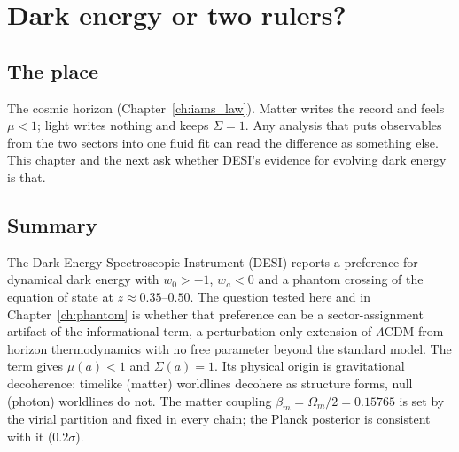 \chapter{Dark energy or two rulers?}\label{ch:sectortension}

\section*{The place}
The cosmic horizon (Chapter~\ref{ch:iams_law}). Matter writes the record and feels $\mu<1$; light writes nothing and keeps $\Sigma=1$. Any analysis that
puts observables from the two sectors into one fluid fit can read the difference as something else. This chapter and the next ask whether DESI's
evidence for evolving dark energy is that.

\section*{Summary}
The Dark Energy Spectroscopic Instrument (DESI) reports a preference for dynamical dark energy with $w_0>-1$, $w_a<0$ and a phantom crossing of the
equation of state at $z\approx0.35$--$0.50$. The question tested here and in Chapter~\ref{ch:phantom} is whether that preference can be a
sector-assignment artifact of the informational term, a perturbation-only extension of $\Lambda$CDM from horizon thermodynamics with no free parameter
beyond the standard model. The term gives $\mu(a)<1$ and $\Sigma(a)=1$. Its physical origin is gravitational decoherence: timelike (matter)
worldlines decohere as structure forms, null (photon) worldlines do not. The matter coupling $\beta_m=\Omega_m/2=0.15765$ is set by the virial
partition and fixed in every chain; the Planck posterior is consistent with it ($0.2\sigma$).

